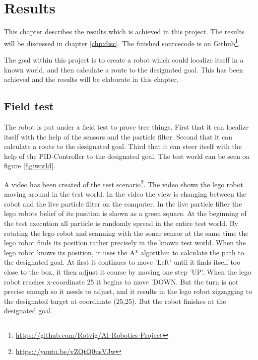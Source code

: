 \chapter{Results}
\label{chp:res}

This chapter describes the results which is achieved in this project. The results will be discussed in chapter \ref{chp:disc}.
The finished sourcecode is on Github\footnote{\url{https://github.com/Rotvig/AI-Robotics-Project}}. 

The goal within this project is to create a robot which could localize itself in a known world, and then calculate a route to the designated goal. 
This has been achieved and the results will be elaborate in this chapter.

\section{Field test}
The robot is put under a field test to prove tree things. First that it can localize itself with the help of the sensors and the particle filter. Second that it can calculate a route to the designated goal. Third that it can steer itself with the help of the PID-Controller to the designated goal. The test world can be seen on figure \ref{fig:world}. 


A video has been created of the test scenario\footnote{\url{https://youtu.be/vZQtQ0usVJw}}. The video shows the lego robot moving around in the test world. In the video the view is changing between the robot and the live particle filter on the computer. In the live particle filter the lego robots belief of its position is shown as a green square.
At the beginning of the test execution all particle is randomly spread in the entire test world. By rotating the lego robot and scanning with the sonar sensor at the same time the lego robot finds its position rather precisely in the known test world. When the lego robot knows its position, it uses the A* algorithm to calculate the path to the designated goal. At first it continues to move 'Left' until it finds itself too close to the box, it then adjust it course by moving one step 'UP'. When the lego robot reaches x-coordinate 25 it begins to move 'DOWN. But the turn is not precise enough so it needs to adjust, and it results in the lego robot zigzagging to the designated target at coordinate (25,25). But the robot finishes at the designated goal.